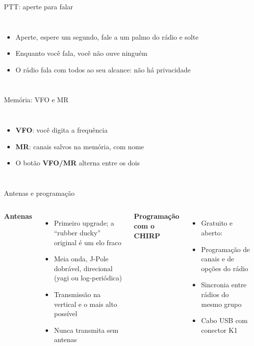 \begin{frame}{PTT: aperte para falar}
  \begin{columns}[c,onlytextwidth]
    \small
    \begin{itemize}
    \item Aperte, espere um segundo, fale a um palmo do rádio e solte
    \item Enquanto você fala, você \alert{não ouve} ninguém
    \item O rádio fala com \alert{todos ao seu alcance}: não há privacidade\asterisco %
    \end{itemize}

    \bigskip\raggedleft
  \end{columns}
\end{frame}

\begin{frame}{Memória: VFO e MR}
  \begin{columns}[c,onlytextwidth]
      \small
      \begin{itemize}
      \item \textbf{VFO}: você digita a frequência
      \item \textbf{MR}: canais salvos na memória, com nome
      \item O botão \textbf{VFO/MR} alterna entre os dois
      \end{itemize}
  \end{columns}
\end{frame}

\begin{frame}{Antenas e programação}
  \begin{columns}[T,onlytextwidth]
      \textbf{Antenas}
      \begin{itemize}
      \item Primeiro upgrade; a “rubber ducky” original é um elo fraco
      \item Meia onda, J-Pole dobrável, direcional (yagi ou log-periódica)
      \item Transmissão na vertical e o mais alto possível
      \item Nunca transmita sem antenas
      \end{itemize}
      \textbf{Programação com o CHIRP}
      \begin{itemize}
      \item Gratuito e aberto: 
      \item Programação de canais e de opções do rádio
      \item Sincronia entre rádios do mesmo grupo
      \item Cabo USB com conector K1
      \end{itemize}
  \end{columns}
\end{frame}

